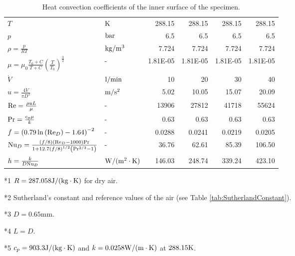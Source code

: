 \begin{table}[htbp]
  \begin{threeparttable}
  \centering
  \caption{Heat convection coefficients of the inner surface of the specimen.}
    \begin{tabular}{llrrrr}
    \toprule
    $T$   & ${\rm{K}}$ & 288.15  & 288.15  & 288.15  & 288.15  \\
    $p$   & ${\rm{bar}}$ & 6.5   & 6.5   & 6.5   & 6.5  \\
    $\rho  = \frac{p}{{RT}}$ \tnote{*1} & ${\rm{kg/}}{{\rm{m}}^{\rm{3}}}$ & 7.724 & 7.724 & 7.724 & 7.724 \\
    $\mu  = {\mu _0}\frac{{{T_0} + C}}{{T + C}}{\left( {\frac{T}{{{T_0}}}} \right)^{\frac{3}{2}}}$ \tnote{*2} & -     & 1.81E-05 & 1.81E-05 & 1.81E-05 & 1.81E-05 \\
    ${\dot V}$ & ${\rm{l/min}}$ & 10    & 20    & 30    & 40  \\
    $u = \frac{{4\dot V}}{{\pi {D^2}}}$ \tnote{*3} & ${\rm{m/}}{{\rm{s}}^2}$ & 5.02  & 10.05  & 15.07  & 20.09  \\
    ${\rm{Re}} = \frac{{\rho uL}}{\mu }$ \tnote{*4} & -     & 13906  & 27812  & 41718  & 55624  \\
    ${\rm{Pr}} = \frac{{{c_p}\mu }}{k}$ \tnote{*5} & -     & 0.63  & 0.63  & 0.63  & 0.63  \\
    $f = {\left( {0.79\ln \left( {{\rm{R}}{{\rm{e}}_D}} \right) - 1.64} \right)^{ - 2}}$ & -     & 0.0288  & 0.0241  & 0.0219  & 0.0205  \\
    ${\rm{N}}{{\rm{u}}_D} = \frac{{\left( {f/8} \right)\left( {{\rm{R}}{{\rm{e}}_D} - 1000} \right){\rm{Pr}}}}{{1 + 12.7{{(f/8)}^{1/2}}\left( {{\rm{P}}{{\rm{r}}^{2/3}} - 1} \right)}}$ & -     & 36.76  & 62.61  & 85.39  & 106.50  \\
    $h = \frac{k}{{D{\rm{N}}{{\rm{u}}_D}}}$ & ${\rm{W/(}}{{\rm{m}}^{\rm{2}}} \cdot {\rm{K)}}$ & 146.03  & 248.74  & 339.24  & 423.10  \\
    \bottomrule
    \end{tabular}%
    \begin{tablenotes}
    \item[*1] $R = 287.058 {\rm{J/(kg}} \cdot {\rm{K}})$ for dry air.
    \item[*2] Sutherland's constant and reference values of the air (see Table \ref{tab:SutherlandConstant}).
    \item[*3] $D=0.65$mm.
    \item[*4] $L=D$.
    \item[*5] $c_{p}=903.3 {\rm{J/(kg}} \cdot {\rm{K}})$ and $k=0.0258 {\rm{W/(m}} \cdot {\rm{K}})$ at $288.15{\rm{K}}$.
    \end{tablenotes}
    \end{threeparttable}
  \label{tab:addlabel}%
\end{table}%


